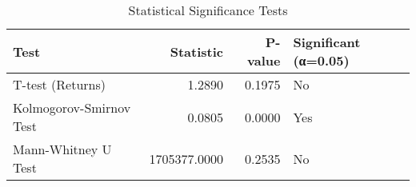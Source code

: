\begin{table}
\caption{Statistical Significance Tests}
\label{tab:statistical}
\begin{tabular}{lrrl}
\toprule
Test & Statistic & P-value & Significant (α=0.05) \\
\midrule
T-test (Returns) & 1.2890 & 0.1975 & No \\
Kolmogorov-Smirnov Test & 0.0805 & 0.0000 & Yes \\
Mann-Whitney U Test & 1705377.0000 & 0.2535 & No \\
\bottomrule
\end{tabular}
\end{table}
